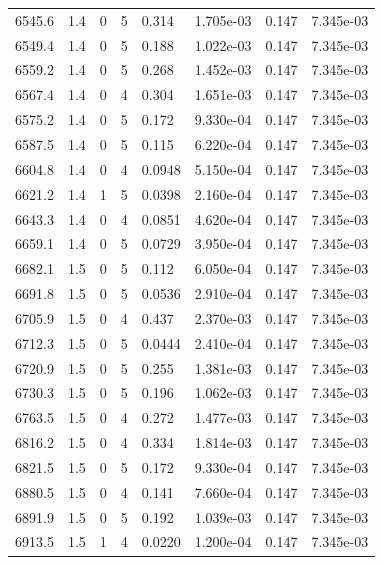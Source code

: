 \documentclass[preview]{standalone}
\begin{document}
{{{{{{{{{{{{{\begin{tabular}{L{1.2cm}C{1.2cm} C{0.3cm}C{0.5cm} C{1.4cm}C{1.4cm} C{1.4cm}C{1.4cm}}
  6545.6  &   1.4  & 0     &  5 &  0.314  & 1.705e-03  & 0.147 &  7.345e-03   \\ 
  6549.4  &   1.4  & 0     &  5 &  0.188  & 1.022e-03  & 0.147 &  7.345e-03   \\ 
  6559.2  &   1.4  & 0     &  5 &  0.268  & 1.452e-03  & 0.147 &  7.345e-03   \\ 
  6567.4  &   1.4  & 0     &  4 &  0.304  & 1.651e-03  & 0.147 &  7.345e-03   \\ 
  6575.2  &   1.4  & 0     &  5 &  0.172  & 9.330e-04  & 0.147 &  7.345e-03   \\ 
  6587.5  &   1.4  & 0     &  5 &  0.115  & 6.220e-04  & 0.147 &  7.345e-03   \\ 
  6604.8  &   1.4  & 0     &  4 &  0.0948  & 5.150e-04  & 0.147 &  7.345e-03   \\ 
  6621.2  &   1.4  & 1     &  5 &  0.0398  & 2.160e-04  & 0.147 &  7.345e-03   \\ 
  6643.3  &   1.4  & 0     &  4 &  0.0851  & 4.620e-04  & 0.147 &  7.345e-03   \\ 
  6659.1  &   1.4  & 0     &  5 &  0.0729  & 3.950e-04  & 0.147 &  7.345e-03   \\ 
  6682.1  &   1.5  & 0     &  5 &  0.112  & 6.050e-04  & 0.147 &  7.345e-03   \\ 
  6691.8  &   1.5  & 0     &  5 &  0.0536  & 2.910e-04  & 0.147 &  7.345e-03   \\ 
  6705.9  &   1.5  & 0     &  4 &  0.437  & 2.370e-03  & 0.147 &  7.345e-03   \\ 
  6712.3  &   1.5  & 0     &  5 &  0.0444  & 2.410e-04  & 0.147 &  7.345e-03   \\ 
  6720.9  &   1.5  & 0     &  5 &  0.255  & 1.381e-03  & 0.147 &  7.345e-03   \\ 
  6730.3  &   1.5  & 0     &  5 &  0.196  & 1.062e-03  & 0.147 &  7.345e-03   \\ 
  6763.5  &   1.5  & 0     &  4 &  0.272  & 1.477e-03  & 0.147 &  7.345e-03   \\ 
  6816.2  &   1.5  & 0     &  4 &  0.334  & 1.814e-03  & 0.147 &  7.345e-03   \\ 
  6821.5  &   1.5  & 0     &  5 &  0.172  & 9.330e-04  & 0.147 &  7.345e-03   \\ 
  6880.5  &   1.5  & 0     &  4 &  0.141  & 7.660e-04  & 0.147 &  7.345e-03   \\ 
  6891.9  &   1.5  & 0     &  5 &  0.192  & 1.039e-03  & 0.147 &  7.345e-03   \\ 
  6913.5  &   1.5  & 1     &  4 &  0.0220  & 1.200e-04  & 0.147 &  7.345e-03   \\ 

\end{tabular}}}}}}}}}}}}}}
\end{document}
